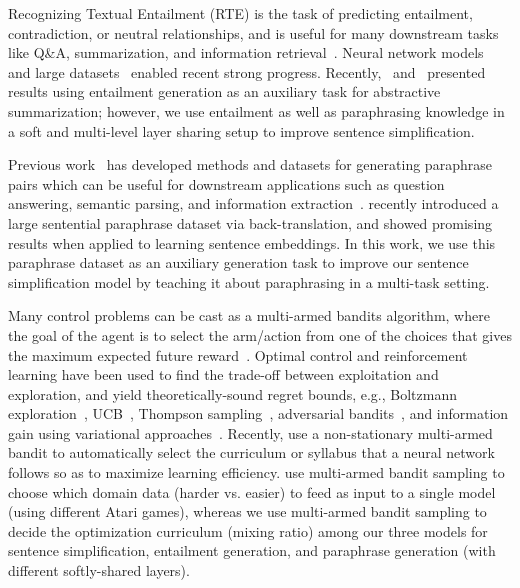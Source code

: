 \documentclass[11pt]{article}
\begin{document}
Recognizing Textual Entailment (RTE) is the task of predicting entailment, contradiction, or neutral relationships, and is useful for many downstream tasks like Q\&A, summarization, and information retrieval~\cite{harabagiu2006methods,dagan2006pascal,lai2014illinois,jimenez2014unal}. Neural network models~\cite{bowman2016snli,parikh2016decomposable} and large datasets~\cite{bowman2016snli,williams2017broad} enabled recent strong progress. Recently,~ and~ presented results using entailment generation as an auxiliary task for abstractive summarization; however, we use entailment as well as paraphrasing knowledge in a soft and multi-level layer sharing setup to improve sentence simplification.

Previous work~\cite{barzilay2001extracting,ganitkevitch2013ppdb,Wieting2017PushingTL} has developed methods and datasets for generating paraphrase pairs which can be useful for downstream applications such as question answering, semantic parsing, and information extraction~\cite{fader2013paraphrase,berant2014semantic,zhang2015exploiting}.  recently introduced a large sentential paraphrase dataset via back-translation, and showed promising results when applied to learning sentence embeddings. In this work, we use this paraphrase dataset as an auxiliary generation task to improve our sentence simplification model by teaching it about paraphrasing in a multi-task setting.

Many control problems can be cast as a multi-armed bandits algorithm, where the goal of the agent is to select the arm/action from one of the  choices that gives the maximum expected future reward~\cite{bubeck2012regret}. Optimal control and reinforcement learning have been used to find the trade-off between exploitation and exploration, and yield theoretically-sound regret bounds, e.g., Boltzmann exploration~\cite{kaelbling1996reinforcement}, UCB~\cite{auer2002finite}, Thompson sampling~\cite{chapelle2011empirical}, adversarial bandits~\cite{auer2002nonstochastic}, and information gain using variational approaches~\cite{houthooft2016vime}. Recently,  use a non-stationary multi-armed bandit to automatically select the curriculum or syllabus that a neural network follows so as to maximize learning efficiency.  use multi-armed bandit sampling to choose which domain data (harder vs. easier) to feed as input to a single model (using different Atari games), whereas we use multi-armed bandit sampling to decide the optimization curriculum (mixing ratio) among our three models for sentence simplification, entailment generation, and paraphrase generation (with different softly-shared layers).
\end{document}
